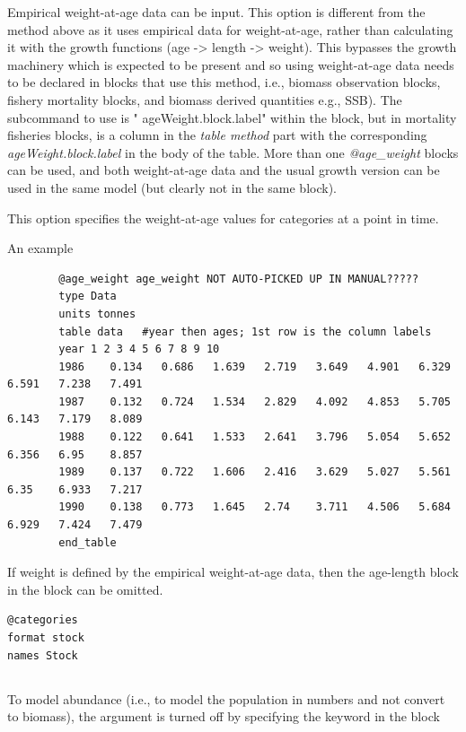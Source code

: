 Empirical weight-at-age data can be input. This option is different from the method above as it uses empirical data for weight-at-age, rather than calculating it with the growth functions (age -> length -> weight). This bypasses the  growth machinery which is expected to be present and so using weight-at-age data  needs to be declared in blocks that use this method, i.e., biomass observation blocks, fishery mortality blocks, and biomass derived quantities e.g., SSB). The subcommand to use is " ageWeight.block.label" within the block, but in mortality fisheries blocks,  is a column in the \textit{table method} part with the corresponding \textit{ageWeight.block.label} in the body of the table. More than one \textit{@age\_weight} blocks can be used, and both  weight-at-age data and the usual growth version can be used in the same model (but clearly not in the same block).

This option specifies the weight-at-age values for categories at a point in time. 


An example

{\small{\begin{verbatim}
		@age_weight age_weight NOT AUTO-PICKED UP IN MANUAL?????
		type Data
		units tonnes
		table data   #year then ages; 1st row is the column labels
		year 1 2 3 4 5 6 7 8 9 10
		1986	0.134	0.686	1.639	2.719	3.649	4.901	6.329	6.591	7.238	7.491
		1987	0.132	0.724	1.534	2.829	4.092	4.853	5.705	6.143	7.179	8.089
		1988	0.122	0.641	1.533	2.641	3.796	5.054	5.652	6.356	6.95	8.857
		1989	0.137	0.722	1.606	2.416	3.629	5.027	5.561	6.35	6.933	7.217
		1990	0.138	0.773	1.645	2.74	3.711	4.506	5.684	6.929	7.424	7.479
		end_table
		\end{verbatim}}}

If weight is defined by the empirical weight-at-age data, then the age-length block in the  block can be omitted.

{\small{\begin{verbatim}
@categories
format stock
names Stock
\end{verbatim}}}


\subsection{\label{sec:weightless-model}}

To model abundance (i.e., to model the population in numbers and not convert to biomass), the  argument is turned off by specifying the keyword  in the  block

